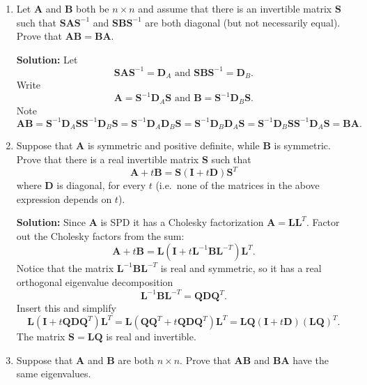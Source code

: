 \documentclass[11pt,fleqn]{article}
\begin{document}
\begin{enumerate}
\item Let $\mathbf{A}$ and $\mathbf{B}$ both be $n\times n$ and assume that there is an invertible matrix $\mathbf{S}$ such that $\mathbf{SAS}^{-1}$ and  $\mathbf{SBS}^{-1}$ are both diagonal (but not necessarily equal). Prove that $\mathbf{AB} = \mathbf{BA}$.

{\bf Solution:} Let
\[\mathbf{SAS}^{-1}=\mathbf{D}_A\text{ and  }\mathbf{SBS}^{-1}=\mathbf{D}_B.\]
Write
\[\mathbf{A}=\mathbf{S}^{-1}\mathbf{D}_A\mathbf{S}\text{ and  }\mathbf{B}=\mathbf{S}^{-1}\mathbf{D}_B\mathbf{S}.\]
Note
\[\mathbf{AB} = \mathbf{S}^{-1}\mathbf{D}_A\mathbf{S}\mathbf{S}^{-1}\mathbf{D}_B\mathbf{S} = \mathbf{S}^{-1}\mathbf{D}_A\mathbf{D}_B\mathbf{S}=\mathbf{S}^{-1}\mathbf{D}_B\mathbf{D}_A\mathbf{S}=\mathbf{S}^{-1}\mathbf{D}_B\mathbf{S}\mathbf{S}^{-1}\mathbf{D}_A\mathbf{S} = \mathbf{BA}.\]

\item Suppose that $\mathbf{A}$ is symmetric and positive definite, while $\mathbf{B}$ is symmetric. Prove that there is a real invertible matrix $\mathbf{S}$ such that
\[\mathbf{A} + t\mathbf{B} = \mathbf{S}\left(\mathbf{I} + t\mathbf{D}\right)\mathbf{S}^T\]
where $\mathbf{D}$ is diagonal, for every $t$ (i.e.\ none of the matrices in the above expression depends on $t$).

{\bf Solution:} Since {\bf A} is SPD it has a Cholesky factorization $\mathbf{A} = \mathbf{LL}^T$.
Factor out the Cholesky factors from the sum:
\[\mathbf{A} + t\mathbf{B} = \mathbf{L}\left(\mathbf{I} + t\mathbf{L}^{-1}\mathbf{BL}^{-T}\right)\mathbf{L}^T.\]
Notice that the matrix $\mathbf{L}^{-1}\mathbf{BL}^{-T}$ is real and symmetric, so it has a real orthogonal eigenvalue decomposition
\[\mathbf{L}^{-1}\mathbf{BL}^{-T} = \mathbf{QDQ}^T.\]
Insert this and simplify
\[\mathbf{L}\left(\mathbf{I} +t\mathbf{QDQ}^T\right)\mathbf{L}^T = \mathbf{L}\left(\mathbf{QQ}^T +t\mathbf{QDQ}^T\right)\mathbf{L}^T=\mathbf{LQ}\left(\mathbf{I} +t\mathbf{D}\right)(\mathbf{LQ})^T.\]
The matrix $\mathbf{S} = \mathbf{LQ}$ is real and invertible.

\item Suppose that $\mathbf{A}$ and $\mathbf{B}$ are both $n\times n$. Prove that $\mathbf{AB}$ and $\mathbf{BA}$ have the same eigenvalues. %


\end{enumerate}
\end{document}

